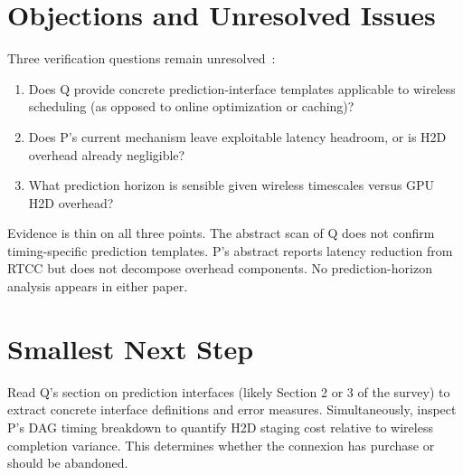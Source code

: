 \documentclass{article}
\begin{document}
\section*{Objections and Unresolved Issues}

Three verification questions remain unresolved~:
\begin{enumerate}
  \item Does Q provide concrete prediction-interface templates applicable to wireless scheduling (as opposed to online optimization or caching)?
  \item Does P's current mechanism leave exploitable latency headroom, or is H2D overhead already negligible?
  \item What prediction horizon is sensible given wireless timescales versus GPU H2D overhead?
\end{enumerate}

Evidence is thin on all three points. The abstract scan of Q does not confirm timing-specific prediction templates. P's abstract reports latency reduction from RTCC but does not decompose overhead components. No prediction-horizon analysis appears in either paper.

\section*{Smallest Next Step}

Read Q's section on prediction interfaces (likely Section 2 or 3 of the survey) to extract concrete interface definitions and error measures. Simultaneously, inspect P's DAG timing breakdown to quantify H2D staging cost relative to wireless completion variance. This determines whether the connexion has purchase or should be abandoned.
\end{document}
